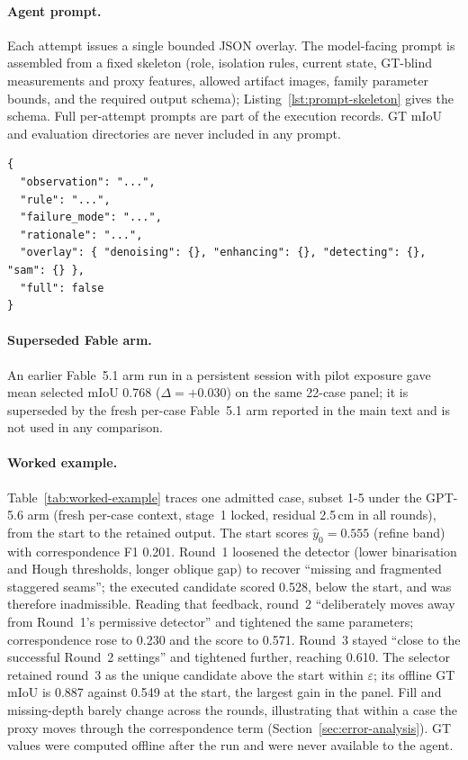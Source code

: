 \documentclass[a4paper,fleqn]{cas-dc}
\begin{document}
\paragraph{Agent prompt.}
Each attempt issues a single bounded JSON overlay. The model-facing prompt is assembled from a fixed skeleton (role, isolation rules, current state, GT-blind measurements and proxy features, allowed artifact images, family parameter bounds, and the required output schema); Listing~\ref{lst:prompt-skeleton} gives the schema. Full per-attempt prompts are part of the execution records. GT mIoU and evaluation directories are never included in any prompt.

\begin{lstlisting}[caption={Required proposal schema (per attempt).},label={lst:prompt-skeleton}]
{
  "observation": "...",
  "rule": "...",
  "failure_mode": "...",
  "rationale": "...",
  "overlay": { "denoising": {}, "enhancing": {}, "detecting": {}, "sam": {} },
  "full": false
}
\end{lstlisting}

\paragraph{Superseded Fable arm.}
An earlier Fable~5.1 arm run in a persistent session with pilot exposure gave mean selected mIoU 0.768 ($\Delta=+0.030$) on the same 22-case panel; it is superseded by the fresh per-case Fable~5.1 arm reported in the main text and is not used in any comparison.

\paragraph{Worked example.}
Table~\ref{tab:worked-example} traces one admitted case, subset 1-5 under the GPT-5.6 arm (fresh per-case context, stage~1 locked, residual 2.5\,cm in all rounds), from the start to the retained output. The start scores $\hat y_0=0.555$ (refine band) with correspondence F1 0.201. Round~1 loosened the detector (lower binarisation and Hough thresholds, longer oblique gap) to recover ``missing and fragmented staggered seams''; the executed candidate scored 0.528, below the start, and was therefore inadmissible. Reading that feedback, round~2 ``deliberately moves away from Round~1's permissive detector'' and tightened the same parameters; correspondence rose to 0.230 and the score to 0.571. Round~3 stayed ``close to the successful Round~2 settings'' and tightened further, reaching 0.610. The selector retained round~3 as the unique candidate above the start within $\varepsilon$; its offline GT mIoU is 0.887 against 0.549 at the start, the largest gain in the panel. Fill and missing-depth barely change across the rounds, illustrating that within a case the proxy moves through the correspondence term (Section~\ref{sec:error-analysis}). GT values were computed offline after the run and were never available to the agent.
\end{document}

